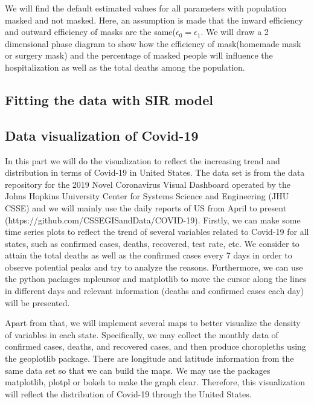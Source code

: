 \documentclass{article}
\begin{document}
We will find the default estimated values for all parameters with population masked and not masked.
Here, an assumption is made that the inward efficiency and outward efficiency of masks are the same($\epsilon_{0} = \epsilon_{1}$. We will draw a 2 dimensional phase diagram to show how the efficiency of mask(homemade mask or surgery mask) and the percentage of masked people will influence the hospitalization as well as the total deaths among the population. 





\subsection{Fitting the data with SIR model}





\subsection{Data visualization of Covid-19}

In this part we will do the visualization to reflect the increasing trend and distribution in terms of Covid-19 in United States. The data set is from the data repository for the 2019 Novel Coronavirus Visual Dashboard operated by the Johns Hopkins University Center for Systems Science and Engineering (JHU CSSE) and we will mainly use the daily reports of US from April to present (https://github.com/CSSEGISandData/COVID-19).
Firstly, we can make some time series plots to reflect the trend of several variables related to Covid-19 for all states, such as confirmed cases, deaths, recovered, test rate, etc. We consider to attain the total deaths as well as the confirmed cases every 7 days in order to observe potential peaks and try to analyze the reasons. Furthermore, we can use the python packages mplcursor and matplotlib to move the cursor along the lines in different days and relevant information (deaths and confirmed cases each day) will be presented. 

Apart from that, we will implement several maps to better visualize the density of variables in each state. Specifically, we may collect the monthly data of confirmed cases, deaths, and recovered cases, and then produce choropleths using the geoplotlib package. There are longitude and latitude information from the same data set so that we can build the maps. We may use the packages matplotlib, plotpl or bokeh to make the graph clear. Therefore, this visualization will reflect the distribution of Covid-19 through the United States. 
\end{document}

